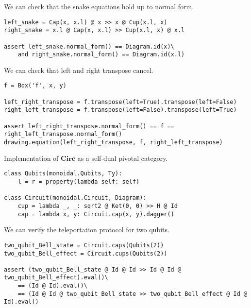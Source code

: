 \begin{example}
We can check that the snake equations hold up to normal form.

\begin{verbatim}
left_snake = Cap(x, x.l) @ x >> x @ Cup(x.l, x)
right_snake = x.l @ Cap(x, x.l) >> Cup(x.l, x) @ x.l

assert left_snake.normal_form() == Diagram.id(x)\
    and right_snake.normal_form() == Diagram.id(x.l)
\end{verbatim}
\end{example}

\begin{example}
We can check that left and right transpose cancel.

\begin{verbatim}
f = Box('f', x, y)

left_right_transpose = f.transpose(left=True).transpose(left=False)
right_left_transpose = f.transpose(left=False).transpose(left=True)

assert left_right_transpose.normal_form() == f == right_left_transpose.normal_form()
drawing.equation(left_right_transpose, f, right_left_transpose)
\end{verbatim}

\end{example}

\begin{python}
{\normalfont Implementation of $\mathbf{Circ}$ as a self-dual pivotal category.}

\begin{verbatim}
class Qubits(monoidal.Qubits, Ty):
    l = r = property(lambda self: self)

class Circuit(monoidal.Circuit, Diagram):
    cup = lambda _, _: sqrt2 @ Ket(0, 0) >> H @ Id
    cap = lambda x, y: Circuit.cap(x, y).dagger()
\end{verbatim}
\end{python}

\begin{example}
We can verify the teleportation protocol for two qubits.

\begin{verbatim}
two_qubit_Bell_state = Circuit.caps(Qubits(2))
two_qubit_Bell_effect = Circuit.cups(Qubits(2))

assert (two_qubit_Bell_state @ Id @ Id >> Id @ Id @ two_qubit_Bell_effect).eval()\
    == (Id @ Id).eval()\
    == (Id @ Id @ two_qubit_Bell_state >> two_qubit_Bell_effect @ Id @ Id).eval()
\end{verbatim}
\end{example}

